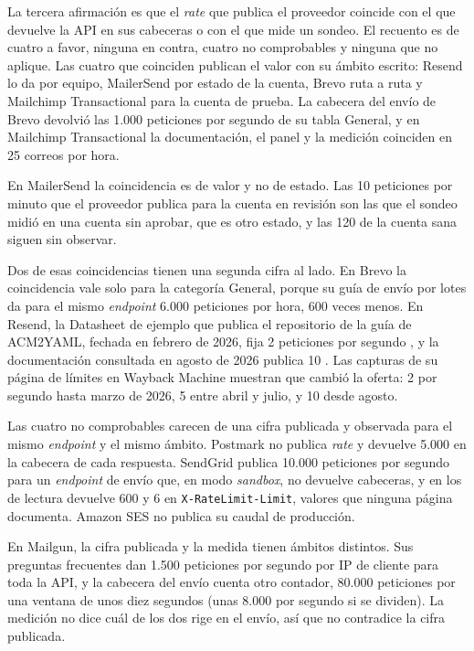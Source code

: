 La tercera afirmación es que el \textit{rate} que publica el proveedor coincide con el que devuelve la API en sus cabeceras o con el que mide un sondeo.
El recuento es de cuatro a favor, ninguna en contra, cuatro no comprobables y ninguna que no aplique.
Las cuatro que coinciden publican el valor con su ámbito escrito: Resend lo da por equipo, MailerSend por estado de la cuenta, Brevo ruta a ruta y Mailchimp Transactional para la cuenta de prueba.
La cabecera del envío de Brevo devolvió las 1.000 peticiones por segundo de su tabla General, y en Mailchimp Transactional la documentación, el panel y la medición coinciden en 25 correos por hora.

En MailerSend la coincidencia es de valor y no de estado.
Las 10 peticiones por minuto que el proveedor publica para la cuenta en revisión son las que el sondeo midió en una cuenta sin aprobar, que es otro estado, y las 120 de la cuenta sana siguen sin observar.

Dos de esas coincidencias tienen una segunda cifra al lado.
En Brevo la coincidencia vale solo para la categoría General, porque su guía de envío por lotes da para el mismo \textit{endpoint} 6.000 peticiones por hora, 600 veces menos.
En Resend, la Datasheet de ejemplo que publica el repositorio de la guía de ACM2YAML, fechada en febrero de 2026, fija 2 peticiones por segundo \citep{apisconsumptionmodel}, y la documentación consultada en agosto de 2026 publica 10 \citep{resenddocs}.
Las capturas de su página de límites en Wayback Machine muestran que cambió la oferta: 2 por segundo hasta marzo de 2026, 5 entre abril y julio, y 10 desde agosto.

Las cuatro no comprobables carecen de una cifra publicada y observada para el mismo \textit{endpoint} y el mismo ámbito.
Postmark no publica \textit{rate} y devuelve 5.000 en la cabecera de cada respuesta.
SendGrid publica 10.000 peticiones por segundo para un \textit{endpoint} de envío que, en modo \textit{sandbox}, no devuelve cabeceras, y en los de lectura devuelve 600 y 6 en \texttt{X-RateLimit-Limit}, valores que ninguna página documenta.
Amazon SES no publica su caudal de producción.

En Mailgun, la cifra publicada y la medida tienen ámbitos distintos.
Sus preguntas frecuentes dan 1.500 peticiones por segundo por IP de cliente para toda la API, y la cabecera del envío cuenta otro contador, 80.000 peticiones por una ventana de unos diez segundos (unas 8.000 por segundo si se dividen).
La medición no dice cuál de los dos rige en el envío, así que no contradice la cifra publicada.

